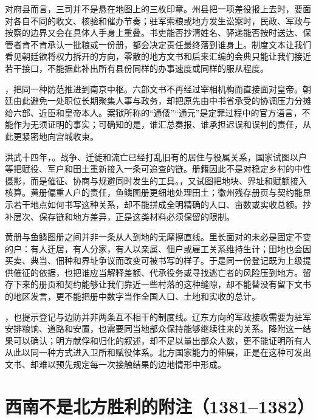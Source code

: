 对府县而言，三司并不是悬在地图上的三枚印章。州县把一项差役报上去时，要面对各自不同的收文、核验和催办节奏；驻军索粮或地方发生讼案时，民政、军政与按察的边界又会在具体人手身上重叠。书吏能否抄清姓名、驿递能否按时送达、保管者肯不肯承认一批粮或一份册，都会决定责任最终落到谁身上。制度文本让我们看见朝廷欲将权力拆开的方向，零散的地方文书和后来汇编的会典只能让我们接近若干接口，不能据此补出所有县份同样的办事速度或同样的服从程度。

，把同一种防范推进到南京中枢。六部文书不再经过宰相机构而直接面对皇帝。朝廷由此避免一处职位长期聚集人事与政务，却把原先由中书省承受的协调压力分摊给六部、近臣和皇帝本人。案狱所称的“通倭”“通元”是定罪过程中的官方语言，不能作为无须证明的事实；可确知的是，谁汇总奏报、谁承担迟误和误判的责任，从此更紧密地向宫城收束。

洪武十四年，。战争、迁徙和流亡已经打乱旧有的居住与役属关系，国家试图以户等把赋役、军户和田土重新接入一条可追查的链。册籍因此不是对稳定乡村的中性摄影，而是催征、协商与规避同时发生的工具。，又试图把地块、界址和赋额接入核算。黄册偏重人户的责任，鱼鳞图册更细地处理田土；徽州残存册页与契约能显示若干地点如何书写这种关系，却不能拼成全明精确的人口、亩数或实收总额。抄补层次、保存链和地方差异，正是这类材料必须保留的限制。

黄册与鱼鳞图册之间并非一条从人到地的无摩擦直线。里长面对的未必是固定不变的户：有人迁居，有人分家，有人以亲属、佃户或雇工关系维持生计；田地也会因买卖、典当、佃种和界址争议而改变可被书写的样子。于是同一份登记既为上级提供催征的依据，也把谁应当解释差额、代承役务或寻找逃亡者的风险压到地方。留存下来的册页和契约能够让我们靠近一些村落的这种缝隙，却不能替没有留下文书的地区发言，更不能把册中数字当作全国人口、土地和实收的总计。

，也提示登记与边防并非两条互不相干的制度线。辽东方向的军政接收需要为驻军安排粮饷、道路和安置，也需要同当地部众保持能够继续往来的关系。降附这一结果可以确认；明方献俘和归化的叙述，却不足以量出部众人数，更不能证明所有人从此以同一种方式进入卫所和赋役体系。北方国家能力的伸展，正是在这种可发出文书、却难以预先规定每一次接触结果的边地情形中形成。

\section{西南不是北方胜利的附注（1381--1382）}

